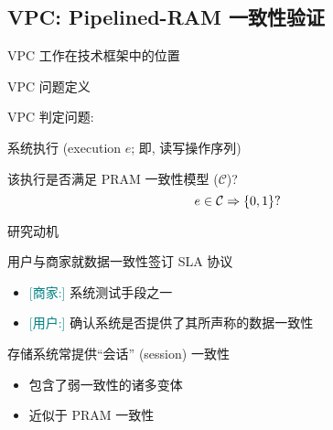 \subsection{VPC: Pipelined-RAM 一致性验证}

\begin{frame}{VPC 工作在技术框架中的位置}
\end{frame}
\begin{frame}{VPC 问题定义}
  \begin{cdef}
    VPC 判定问题:
	\vspace{8pt}
    \begin{description}
	  \setlength{\itemsep}{8pt}
      \item[实例:] 系统执行 {\small (execution $e$; 即, 读写操作序列)}
      \item[问题:] 该执行是否满足 PRAM 一致性模型 {\small ($\mathcal{C}$)}? 
		\[
		  e \in \mathcal{C} \Rightarrow \{0,1\}?
		\]
    \end{description}    
  \end{cdef}
\end{frame}
\begin{frame}{研究动机}
  \vspace{0.50cm}

  \begin{description}
    \setlength{\itemsep}{15pt}
    \item[验证:] 用户与商家就数据一致性签订 SLA 协议 \\
	   
	  \vspace{5pt}
	  \begin{itemize}
		\item \textcolor{teal}{[商家:]} 系统测试手段之一
		\item \textcolor{teal}{[用户:]} 确认系统是否提供了其所声称的数据一致性 
	  \end{itemize}
	\pause
	\item[PRAM:] 存储系统常提供``会话'' {\small (session)} 一致性\\
       
	  \vspace{5pt}
      \begin{itemize}
		\item 包含了弱一致性的诸多变体 
		\item 近似于 PRAM 一致性  
      \end{itemize}
  \end{description}
\end{frame}
